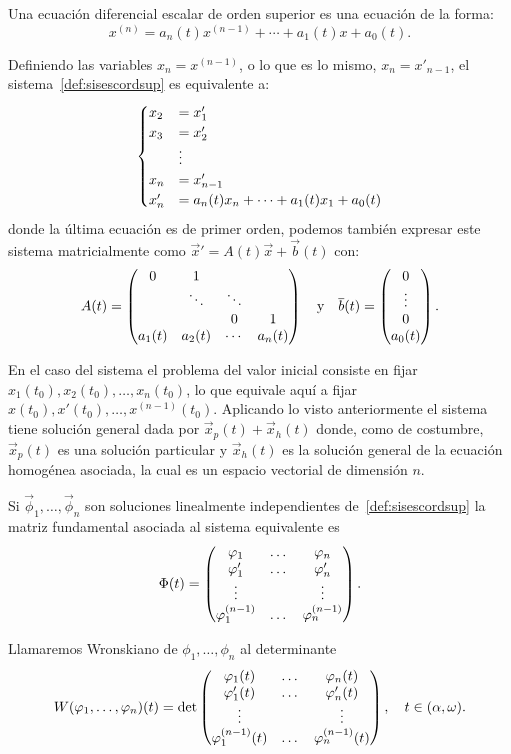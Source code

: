 \documentclass[../ecuaciones_diferenciales.tex]{subfiles}
\begin{document}
\begin{definition}
	\label{def:sisescordsup}
	Una ecuación diferencial escalar de orden superior es una ecuación de la
	forma:
	\[x^{(n)} = a_n(t) x^{(n - 1)} + \cdots + a_1(t)x + a_0(t).\]
\end{definition}

Definiendo las variables \(x_n = x^{(n - 1)}\), o lo que es lo mismo,
\(x_n = x'_{n - 1}\), el sistema~\ref{def:sisescordsup} es equivalente a:
\[\begin{cases}
	x_2 &= x'_1 \\
	x_3 &= x'_2 \\
	&\vdots \\
	x_n &= x'_{n - 1} \\
	x'_n &= a_n(t) x_n + \cdots + a_1(t) x_1 + a_0(t)
	\end{cases}\]
donde la última ecuación es de primer orden, podemos también expresar este
sistema matricialmente como \(\vec{x}' = A(t)\vec{x} + \vec{b}(t)\) con:
\[A(t) = \begin{pmatrix}
		0 & 1 & & \\
		& \ddots & \ddots & \\
		& & 0 & 1 \\
		a_1(t) & a_2(t) & \cdots & a_n(t)
	\end{pmatrix}
	\quad \text{y} \quad
	\overline{b}(t) = \begin{pmatrix}0 \\ \vdots \\ 0 \\ a_0(t)\end{pmatrix}.
\]

En el caso del sistema el problema del valor inicial consiste en fijar 
\(x_1(t_0), x_2(t_0), \dots, x_n(t_0)\), lo que equivale aquí a fijar 
\(x(t_0), x'(t_0), \dots, x^{(n-1)}(t_0)\). 
Aplicando lo visto anteriormente el sistema tiene
solución general dada por \(\vec{x}_p(t) + \vec{x}_h(t)\) donde, 
como de costumbre, \(\vec{x}_p(t)\) es una solución particular y 
\(\vec{x}_h(t)\) es la solución general de la ecuación homogénea asociada, 
la cual es un espacio vectorial de dimensión \(n\).

Si \(\vec{\phi}_1, \dots, \vec{\phi}_n\) son soluciones linealmente 
independientes de~\ref{def:sisescordsup} la matriz fundamental asociada al 
sistema equivalente es
\[\Phi(t) = \begin{pmatrix}
		\varphi_1 & \dots & \varphi_n \\
		\varphi'_1 & \dots & \varphi'_n \\
		\vdots & & \vdots \\
		\varphi^{(n - 1)}_1 & \dots & \varphi^{(n - 1)}_n\end{pmatrix}.\]

\begin{definition}[Wronskiano]
	Llamaremos Wronskiano de \(\phi_1, \dots, \phi_n\) al determinante
	\[W(\varphi_1, \dots, \varphi_n)(t) = \det\begin{pmatrix}
			\varphi_1(t) & \dots & \varphi_n(t) \\
			\varphi'_1(t) & \dots & \varphi'_n(t) \\
			\vdots & & \vdots \\
			\varphi^{(n - 1)}_1(t) & \dots & \varphi^{(n - 1)}_n(t) \\
		\end{pmatrix}, \quad t \in (\alpha, \omega).\]
\end{definition}
\end{document}

